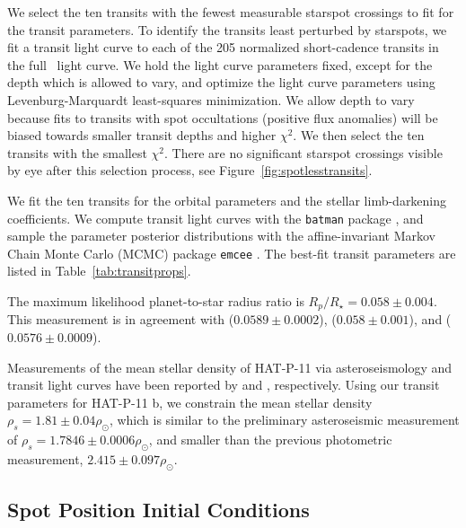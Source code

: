 We select the ten transits with the fewest measurable starspot crossings to fit for the transit parameters. To identify the transits least perturbed by starspots, we fit a \citet{Mandel2002} transit light curve to each of the 205 normalized short-cadence transits in the full \kepler\ light curve. We hold the light curve parameters fixed, except for the depth which is allowed to vary, and optimize the light curve parameters using Levenburg-Marquardt least-squares minimization. We allow depth to vary because fits to transits with spot occultations (positive flux anomalies) will be biased towards smaller transit depths and higher $\chi^2$. We then select the ten transits with the smallest $\chi^2$. There are no significant starspot crossings visible by eye after this selection process, see Figure~\ref{fig:spotlesstransits}. 

We fit the ten transits for the orbital parameters and the stellar limb-darkening coefficients. We compute transit light curves with the \texttt{batman} package \citep{Kreidberg2015}, and sample the parameter posterior distributions with the affine-invariant Markov Chain Monte Carlo (MCMC) package \texttt{emcee} \citep{Foreman-Mackey2013}. The best-fit transit parameters are listed in Table~\ref{tab:transitprops}. 

The maximum likelihood planet-to-star radius ratio is $R_p/R_\star = 0.058 \pm 0.004$. This measurement is in agreement with \citet{Deming2011} ($0.0589 \pm 0.0002$), \citet{Southworth2011} ($0.058 \pm 0.001$), and \citet{Bakos2010} ($0.0576 \pm 0.0009$).

Measurements of the mean stellar density of HAT-P-11 via asteroseismology and transit light curves have been reported by \citet{Christensen-Dalsgaard2010} and \citet{Southworth2011}, respectively. Using our transit parameters for HAT-P-11 b, we constrain the mean stellar density $\rho_s = 1.81 \pm 0.04 \rho_\odot$, which is similar to the preliminary asteroseismic measurement of $\rho_s = 1.7846 \pm 0.0006 \rho_\odot$, and smaller than the previous photometric measurement, $2.415 \pm 0.097\rho_\odot$.

\subsection{Spot Position Initial Conditions} \label{sec:spotoccmodel}

